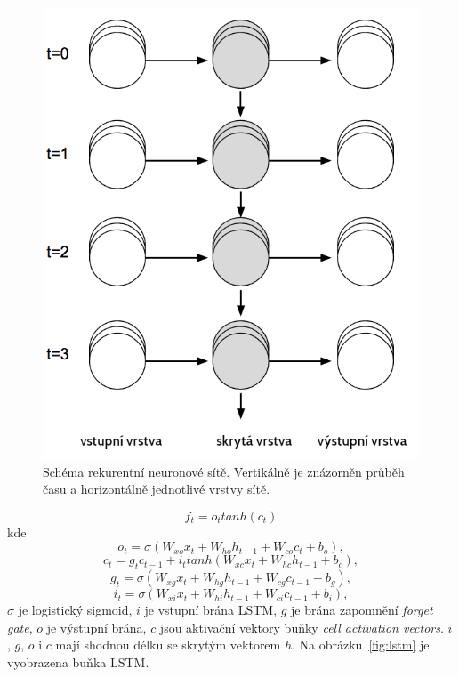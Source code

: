 \begin{figure}[htpb]
\includegraphics[scale=1]{rc/rnn1h.png}
\caption{
    Schéma rekurentní neuronové sítě. Vertikálně je znázorněn průběh času a
    horizontálně jednotlivé vrstvy sítě.
}
\label{fig:rnn}
\end{figure}

\begin{equation}
f_t = o_t tanh(c_t)
\end{equation}
kde
\begin{equation}
o_t = \sigma(W_{xo}x_t + W_{ho}h_{t-1} + W_{co}c_t + b_o),
\end{equation}
\begin{equation}
c_t = g_{t}c_{t-1} + i_t tanh(W_{xc}x_t + W_{hc}h_{t-1} + b_c),
\end{equation}
\begin{equation}
g_t = \sigma(W_{xg}x_t + W_{hg}h_{t-1} + W_{cg}c_{t-1} + b_g),
\end{equation}
\begin{equation}
i_t = \sigma(W_{xi}x_t + W_{hi}h_{t-1} + W_{ci}c_{t-1} + b_i),
\end{equation}
$\sigma$ je logistický sigmoid, $i$ je vstupní brána LSTM, $g$ je brána zapomnění
\textit{forget gate}, $o$ je výstupní brána, $c$ jsou aktivační vektory buňky
\textit{cell activation vectors}. $i$, $g$, $o$ i $c$ mají shodnou délku se
skrytým vektorem $h$. Na obrázku~\ref{fig:lstm} je vyobrazena buňka LSTM.

